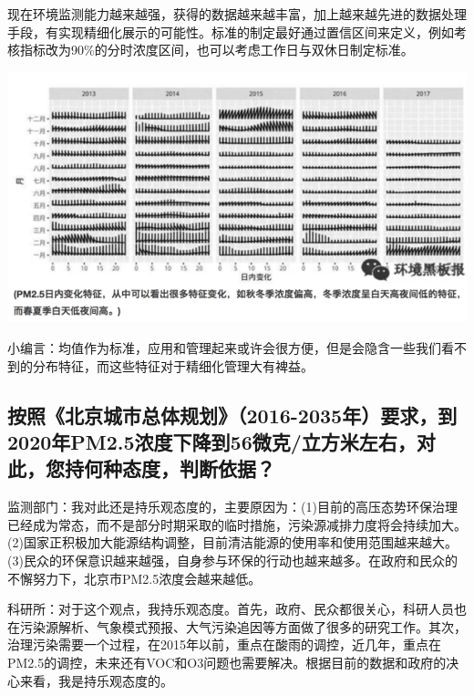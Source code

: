 \documentclass[]{book}
\begin{document}
现在环境监测能力越来越强，获得的数据越来越丰富，加上越来越先进的数据处理手段，有实现精细化展示的可能性。标准的制定最好通过置信区间来定义，例如考核指标改为90\%的分时浓度区间，也可以考虑工作日与双休日制定标准。

\includegraphics[width=8.33in]{images/air4}

小编言：均值作为标准，应用和管理起来或许会很方便，但是会隐含一些我们看不到的分布特征，而这些特征对于精细化管理大有裨益。

\hypertarget{ux6309ux7167ux5317ux4eacux57ceux5e02ux603bux4f53ux89c4ux52122016-2035ux5e74ux8981ux6c42ux52302020ux5e74pm2.5ux6d53ux5ea6ux4e0bux964dux523056ux5faeux514bux7acbux65b9ux7c73ux5de6ux53f3ux5bf9ux6b64ux60a8ux6301ux4f55ux79cdux6001ux5ea6ux5224ux65adux4f9dux636e}{%
\subsection{按照《北京城市总体规划》（2016-2035年）要求，到2020年PM2.5浓度下降到56微克/立方米左右，对此，您持何种态度，判断依据？}\label{ux6309ux7167ux5317ux4eacux57ceux5e02ux603bux4f53ux89c4ux52122016-2035ux5e74ux8981ux6c42ux52302020ux5e74pm2.5ux6d53ux5ea6ux4e0bux964dux523056ux5faeux514bux7acbux65b9ux7c73ux5de6ux53f3ux5bf9ux6b64ux60a8ux6301ux4f55ux79cdux6001ux5ea6ux5224ux65adux4f9dux636e}}

监测部门：我对此还是持乐观态度的，主要原因为：(1)目前的高压态势环保治理已经成为常态，而不是部分时期采取的临时措施，污染源减排力度将会持续加大。(2)国家正积极加大能源结构调整，目前清洁能源的使用率和使用范围越来越大。(3)民众的环保意识越来越强，自身参与环保的行动也越来越多。在政府和民众的不懈努力下，北京市PM2.5浓度会越来越低。

科研所：对于这个观点，我持乐观态度。首先，政府、民众都很关心，科研人员也在污染源解析、气象模式预报、大气污染追因等方面做了很多的研究工作。其次，治理污染需要一个过程，在2015年以前，重点在酸雨的调控，近几年，重点在PM2.5的调控，未来还有VOC和O3问题也需要解决。根据目前的数据和政府的决心来看，我是持乐观态度的。
\end{document}
